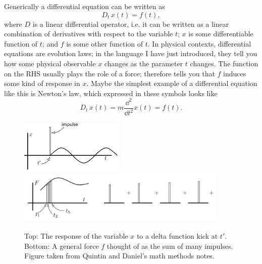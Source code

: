 Generically a differential equation can be written as
\begin{equation}\label{eq:diffyq}
  D_t\,x(t) = f(t),
\end{equation}
where $D$ is a linear differential operator, i.e. it can be written as
a linear combination of derivatives with respect to the variable $t$;
$x$ is some differentiable function of $t$; and $f$ is some other
function of $t$. In physical contexts, differential equations are
evolution laws; in the language I have just introduced, they tell you
how some physical observable $x$ changes as the parameter $t$ changes.
The function on the RHS usually plays the role of a force; therefore
 tells you that $f$ induces some kind of response in 
$x$. Maybe the simplest example of a differential equation like this
is Newton's law, which expressed in these symbols looks like
\begin{equation}
  D_t\,x(t)=m\frac{\dd^2}{\dd t^2}x(t) = f(t).
\end{equation}

\begin{figure}\label{fig:impulse}
\centering
\includegraphics[width=0.44\textwidth]{figs/impulse.png}\\
\includegraphics[width=0.90\textwidth]{figs/manyimpulses.png}
\caption{Top: The response of the variable $x$ to a delta function kick at 
$t'$. Bottom: A general force $f$ thought of as the sum of many impulses.
Figure taken from Quintin and Daniel's math methods notes.}
\end{figure}

